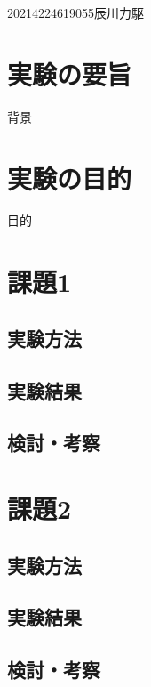 \documentclass[12pt]{jarticle}
\begin{document}
{2021}{4}{22}{4619055}{辰川力駆}
\section{実験の要旨}
背景


\section{実験の目的}
目的


\section{課題1}
\subsection{実験方法}
\subsection{実験結果}
\subsection{検討・考察}

\section{課題2}
\subsection{実験方法}
\subsection{実験結果}
\subsection{検討・考察}
\end{document}

